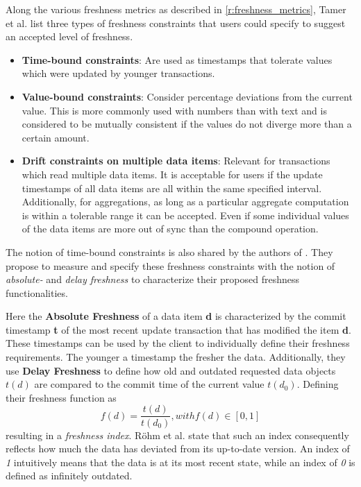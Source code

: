 Along the various freshness metrics as described in \ref{r:freshness_metrics}, Tamer et al. \cite{tamer:2005} list three types of freshness constraints that users could specify to
suggest an accepted level of freshness.
\begin{itemize}
    \item \textbf{Time-bound constraints}: Are used as timestamps that tolerate values which were updated by younger transactions. 

    \item \textbf{Value-bound constraints}: Consider percentage deviations from the current value. This is more commonly used with numbers than with text and is considered to
    be mutually consistent if the values do not diverge more than a certain amount.

    \item \textbf{Drift constraints on multiple data items}: Relevant for transactions which read multiple data items. It is acceptable for users if the update timestamps 
    of all data items are all within the same specified interval. Additionally, for aggregations, as long as a particular aggregate computation 
    is within a tolerable range it can be accepted. Even if some individual values of the data items are more out of sync than the compound operation.
\end{itemize}

The notion of time-bound constraints is also shared by the authors of \cite{voicu:2010}. They propose to measure and specify these freshness constraints 
with the notion of \emph{absolute-} and \emph{delay freshness} to characterize their proposed freshness functionalities.

Here the \textbf{Absolute Freshness} of a data item \textbf{d} is characterized by the commit timestamp \textbf{t} 
of the most recent update transaction that has modified the item \textbf{d}.
These timestamps can be used by the client to individually define their freshness requirements. The younger a timestamp the fresher the data.
Additionally, they use \textbf{Delay Freshness} to define how old and outdated requested data objects $t(d)$ are compared to the commit time of the current value $t(d_0)$.
Defining their freshness function as 
\begin{equation}
    f(d) = \frac{t(d)}{t(d_0)},  with f(d) \in [0,1]
\end{equation} 
resulting in a \emph{freshness index}.
Röhm et al. \cite{rohm:2002} state that such an index consequently reflects how much the data has deviated from its up-to-date version.
An index of \emph{1} intuitively means that the data is at its most recent state, while an index of \emph{0} is defined as infinitely outdated.

